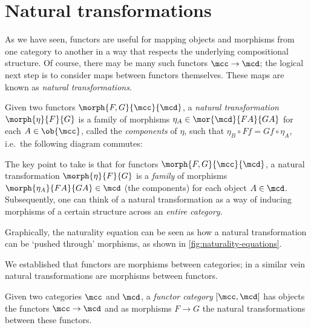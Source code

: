 \section{Natural transformations}\label{sec:natural-transformations}

As we have seen, functors are useful for mapping objects and morphisms from one
category to another in a way that respects the underlying compositional
structure.
Of course, there may be many such functors \(\mcc \to \mcd\); the logical next
step is to consider maps between functors themselves.
These maps are known as \emph{natural transformations}.

\begin{definition}
    Given two functors \(\morph{F, G}{\mcc}{\mcd}\), a
    \emph{natural transformation} \(\morph{\eta}{F}{G}\) is a family of
    morphisms \(
    \eta_A \in \mor{\mcd}{FA}{GA}
    \) for each \(A \in \ob{\mcc}\), called the \emph{components} of \(\eta\),
    such that \(
    \eta_B \circ Ff = Gf \circ \eta_A
    \), i.e.\ the following diagram commutes:
    \begin{center}
        
    \end{center}
\end{definition}

The key point to take is that for functors \(\morph{F,G}{\mcc}{\mcd}\), a
natural transformation \(\morph{\eta}{F}{G}\) is a \emph{family} of morphisms
\(\morph{\eta_A}{FA}{GA} \in \mcd\) (the components) for each object
\(A \in \mcd\).
Subsequently, one can think of a natural transformation as a way of inducing
morphisms of a certain structure across an \emph{entire category}.

Graphically, the naturality equation can be seen as how a natural transformation
can be `pushed through' morphisms, as shown in \cref{fig:naturality-equations}.



We established that functors are morphisms between categories; in a similar
vein natural transformations are morphisms between functors.

\begin{definition}
    Given two categories \(\mcc\) and \(\mcd\), a \emph{functor category}
    \([\mcc,\mcd]\) has objects the functors \(\mcc \to \mcd\) and as morphisms
    \(F \to G\) the natural transformations between these functors.
\end{definition}


